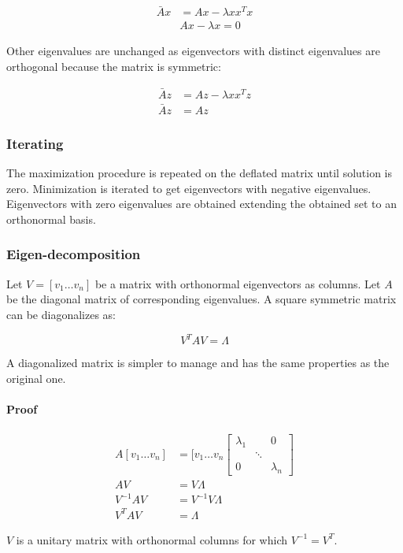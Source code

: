 		\begin{align*}
			\bar{A}x &= Ax -\lambda xx^Tx\\
				 &Ax-\lambda x = 0
		\end{align*}
		
		Other eigenvalues are unchanged as eigenvectors with distinct eigenvalues are orthogonal because the matrix is symmetric:

		\begin{align*}
			\bar{A}z &= Az-\lambda xx^Tz\\
			\bar{A}z &=Az
		\end{align*}

		\subsubsection{Iterating}
		The maximization procedure is repeated on the deflated matrix until solution is zero.
		Minimization is iterated to get eigenvectors with negative eigenvalues.
		Eigenvectors with zero eigenvalues are obtained extending the obtained set to an orthonormal basis.
		
		\subsubsection{Eigen-decomposition}
		Let $V = [v_1 \dots v_n]$ be a matrix with orthonormal eigenvectors as columns.
		Let $A$ be the diagonal matrix of corresponding eigenvalues.
		A square symmetric matrix can be diagonalizes as:

		$$V^TAV=\Lambda$$

		A diagonalized matrix is simpler to manage and has the same properties as the original one.

			\paragraph{Proof}

			\begin{align*}
				A[v_1\dots v_n] &= [v_1\dots v_n \begin{bmatrix}\lambda_1 & & 0\\ & \ddots & \\ 0 & & \lambda_n\end{bmatrix}\\
				AV &= V\Lambda\\
				V^{-1}AV &= V^{-1}V\Lambda\\
				V^TAV &= \Lambda
			\end{align*}

			$V$ is a unitary matrix with orthonormal columns for which $V^{-1}=V^T$.
